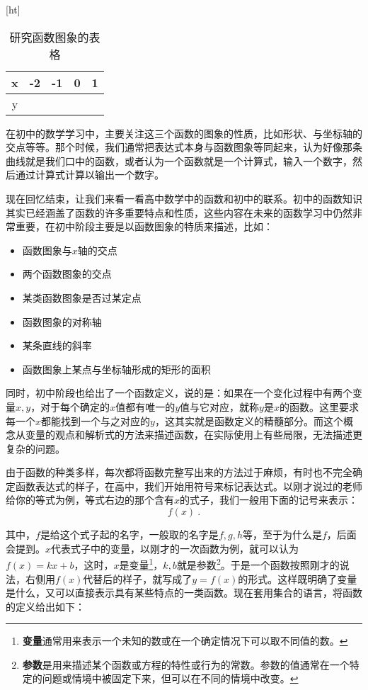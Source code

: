\begin{table}\label{tab_functi_1}[ht]
\centering
\caption{研究函数图象的表格}\label{tab_functi1}
\begin{tabular}{|c|c|c|c|c|}
\hline
x & -2 & -1 & 0 & 1 \\
\hline
y &   &   &   &   \\
\hline
\end{tabular}
\end{table}

在初中的数学学习中，主要关注这三个函数的图象的性质，比如形状、与坐标轴的交点等等。那个时候，我们通常把表达式本身与函数图象等同起来，认为好像那条曲线就是我们口中的函数，或者认为一个函数就是一个计算式，输入一个数字，然后通过计算式计算以输出一个数字。

现在回忆结束，让我们来看一看高中数学中的函数和初中的联系。初中的函数知识其实已经涵盖了函数的许多重要特点和性质，这些内容在未来的函数学习中仍然非常重要，在初中阶段主要是以函数图象的特质来描述，比如：
\begin{itemize}
\item 函数图象与$x$轴的交点
\item 两个函数图象的交点
\item 某类函数图象是否过某定点
\item 函数图象的对称轴
\item 某条直线的斜率
\item 函数图象上某点与坐标轴形成的矩形的面积
\end{itemize}

同时，初中阶段也给出了一个函数定义，说的是：如果在一个变化过程中有两个变量$x,y$，对于每个确定的$x$值都有唯一的$y$值与它对应，就称$y$是$x$的函数。这里要求每一个$x$都能找到一个与之对应的$y$，这其实就是函数定义的精髓部分。而这个概念从变量的观点和解析式的方法来描述函数，在实际使用上有些局限，无法描述更复杂的问题。

由于函数的种类多样，每次都将函数完整写出来的方法过于麻烦，有时也不完全确定函数表达式的样子，在高中，我们开始用符号来标记表达式。以刚才说过的老师给你的等式为例，等式右边的那个含有$x$的式子，我们一般用下面的记号来表示：
\begin{equation}
f(x)~.
\end{equation}

其中，$f$是给这个式子起的名字，一般取的名字是$f,g,h$等，至于为什么是$f$，后面会提到。$x$代表式子中的变量，以刚才的一次函数为例，就可以认为$f(x)=kx+b$，这时，$x$是变量\footnote{\textbf{变量}通常用来表示一个未知的数或在一个确定情况下可以取不同值的数。}，$k,b$就是参数\footnote{\textbf{参数}是用来描述某个函数或方程的特性或行为的常数。参数的值通常在一个特定的问题或情境中被固定下来，但可以在不同的情境中改变。}。于是一个函数按照刚才的说法，右侧用$f(x)$代替后的样子，就写成了$y=f(x)$的形式。这样既明确了变量是什么，又可以直接表示具有某些特点的一类函数。现在套用集合的语言，将函数的定义给出如下：

